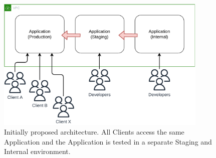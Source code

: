 \begin{figure}[!htbp]
    \centering
    \includegraphics[width=0.90\textwidth]{img/diagrams/pdf/new-arch-single-app.drawio.pdf}
    \caption[Initially Proposed Architecture]{Initially proposed architecture. All Clients access the same Application and the Application is tested in a separate Staging and Internal environment.}
    \label{fig:new-arch-single-app}
\end{figure}
